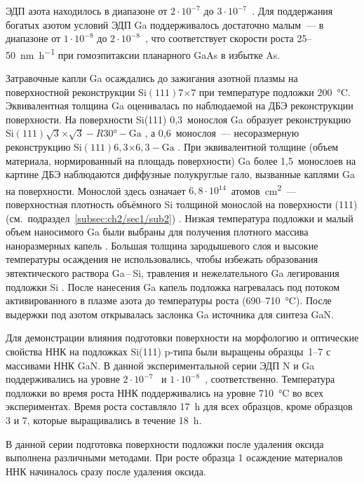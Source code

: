 ЭДП азота находилось в диапазоне от \(2 \cdot 10^{-7}\) до \(3 \cdot
10^{-7}\)~\si{\torr}. Для поддержания богатых азотом условий ЭДП Ga
поддерживалось достаточно малым~--- в диапазоне от \(1 \cdot 10^{-8}\) до \(2
\cdot 10^{-8}\)~\si{\torr}, что соответствует скорости роста
25--50~\si{\nano\meter\per\hour} при гомоэпитаксии планарного GaAs в избытке
As.

Затравочные капли Ga осаждались до зажигания азотной плазмы на поверхностной
реконструкции Si\((111)7\)\(\times\)\(7\) при температуре подложки
200~\si{\degreeCelsius}. Эквивалентная толщина Ga оценивалась по наблюдаемой на
ДБЭ реконструкции поверхности. На поверхности Si(111) 0,3~монослоя Ga образует
реконструкцию Si\((111)\sqrt{3}\)\(\times\)\(\sqrt{3} - R30\si{\degree} -
\text{Ga}\) \cite{Kawazu1988}, а 0,6~монослоя~--- несоразмерную реконструкцию
Si\((111)6,3\)\(\times\)\(6,3 - \text{Ga}\) \cite{Cechal2007}. При
эквивалентной толщине (объем материала, нормированный на площадь поверхности)
Ga более 1,5~монослоев на картине ДБЭ наблюдаются диффузные полукруглые гало,
вызванные каплями Ga на поверхности. Монослой здесь означает \(6,8 \cdot
10^{14}\)~атомов\si{\per\centi\meter^{2}}~--- поверхностная плотность объёмного
Si толщиной монослой на поверхности (111)
(см.~подраздел~\cref{subsec:ch2/sec1/sub2}) \cite{Kumar2010}. Низкая
температура подложки и малый объем наносимого Ga были выбраны для получения
плотного массива наноразмерных капель \cite{Ristic2008}. Большая толщина
зародышевого слоя и высокие температуры осаждения не использовались, чтобы
избежать образования эвтектического раствора Ga\,--\,Si, травления и
нежелательного Ga легирования подложки Si \cite{Yamane2009, Dadgar2015}. После
нанесения Ga капель подложка нагревалась под потоком активированного в плазме
азота до температуры роста (690--710~\si{\degreeCelsius}). После выдержки под
азотом открывалась заслонка Ga источника для синтеза GaN.

Для демонстрации влияния подготовки поверхности на морфологию и оптические
свойства ННК на подложках Si(111) p-типа были выращены образцы~1--7 с массивами
ННК GaN. В данной экспериментальной серии ЭДП N и Ga поддерживались на уровне
\(2 \cdot 10^{-7}\)~\si{\torr} и \(1 \cdot 10^{-8}\)~\si{\torr},
соответственно. Температура подложки во время роста ННК поддерживались на
уровне 710~\si{\degreeCelsius} во всех экспериментах. Время роста составляло
17~\si{\hour} для всех образцов, кроме образцов 3 и 7, которые выращивались в
течение 18~\si{\hour}.

В данной серии подготовка поверхности подложки после удаления оксида выполнена
различными методами. При росте образца 1 осаждение материалов ННК начиналось
сразу после удаления оксида.

